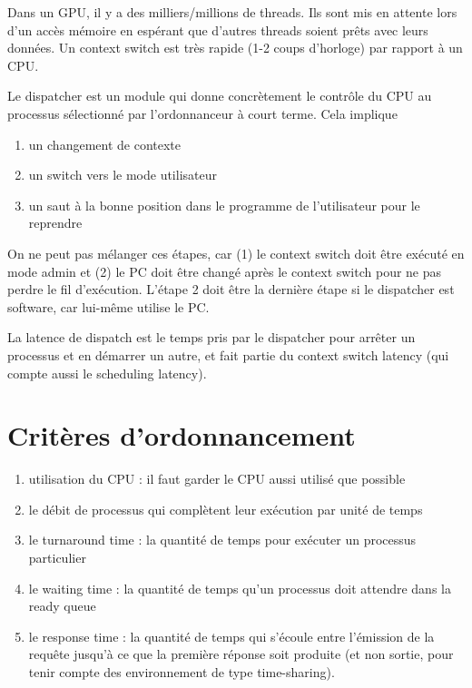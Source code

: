 Dans un GPU, il y a des milliers/millions de threads. Ils sont mis en attente lors d'un accès mémoire en espérant que d'autres threads soient prêts avec leurs données. Un context switch est très rapide (1-2 coups d'horloge) par rapport à un CPU.

Le dispatcher est un module qui donne concrètement le contrôle du CPU au processus sélectionné par l'ordonnanceur à court terme. Cela implique

\begin{enumerate}
	\item un changement de contexte
	\item un switch vers le mode utilisateur
	\item un saut à la bonne position dans le programme de l'utilisateur pour le reprendre
\end{enumerate}

On ne peut pas mélanger ces étapes, car (1) le context switch doit être exécuté en mode admin et (2) le PC doit être changé après le context switch pour ne pas perdre le fil d'exécution. L'étape 2 doit être la dernière étape si le dispatcher est software, car lui-même utilise le PC.

La latence de dispatch est le temps pris par le dispatcher pour arrêter un processus et en démarrer un autre, et fait partie du context switch latency (qui compte aussi le scheduling latency).

\section{Critères d'ordonnancement}

\begin{enumerate}
	\item utilisation du CPU : il faut garder le CPU aussi utilisé que possible
	\item le débit de processus qui complètent leur exécution par unité de temps
	\item le turnaround time : la quantité de temps pour exécuter un processus particulier
	\item le waiting time : la quantité de temps qu'un processus doit attendre dans la ready queue
	\item le response time : la quantité de temps qui s'écoule entre l'émission de la requête jusqu'à ce que la première réponse soit produite (et non sortie, pour tenir compte des environnement de type time-sharing).
\end{enumerate}

